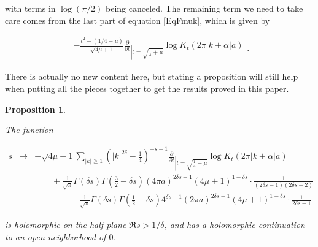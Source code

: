 \documentclass{jams-l}
\newtheorem{proposition}[theorem]{Proposition}
\theoremstyle{definition}
\theoremstyle{remark}
\numberwithin{equation}{section}
\begin{document}
            \noindent with terms in $\log \left( \pi / 2 \right)$ being canceled. The remaining term we need to take care comes from the last part of equation \eqref{EqFmuk}, which is given by
            
            \[ \begin{array}{c}
                    - \frac{t^2 - \left( 1/4 + \mu \right)}{\sqrt{4 \mu + 1}} \frac{\partial}{\partial t}_{\left \vert t = \sqrt{\frac{1}{4} + \mu} \right.} \log K_t \left( 2 \pi \left \vert k + \alpha \right \vert a \right)
                \end{array} . \]
            
            \noindent There is actually no new content here, but stating a proposition will still help when putting all the pieces together to get the results proved in this paper.
            
            \begin{proposition}
            \label{PropA11}
            
                The function
                
                \[ \begin{array}{lll}
                        \scriptstyle s & \scriptstyle \mapsto & \scriptstyle - \sqrt{4 \mu + 1} \sum\limits_{\left \vert k \right \vert \geqslant 1} \left( \left \vert k \right \vert^{2 \delta} - \frac{1}{4} \right)^{- s + 1} \frac{\partial}{\partial t}_{\left \vert t = \sqrt{\frac{1}{4} + \mu} \right.} \log K_t \left( 2 \pi \left \vert k + \alpha \right \vert a \right) \\[1em]
                        
                        && \qquad \scriptstyle + \frac{1}{\sqrt{\pi}} \Gamma \left( \delta s \right) \Gamma \left( \frac{3}{2} - \delta s \right) \left( 4 \pi a \right)^{2 \delta s - 1} \left( 4 \mu + 1 \right)^{1 - \delta s} \cdot \frac{1}{\left( 2 \delta s - 1 \right) \left( 2 \delta s - 2 \right)} \\[1em]
                        
                        && \qquad \qquad \scriptstyle + \frac{1}{\sqrt{\pi}} \Gamma \left( \delta s \right) \Gamma \left( \frac{1}{2} - \delta s \right) 4^{\delta s - 1} \left( 2 \pi a \right)^{2 \delta s - 1} \left( 4 \mu + 1 \right)^{1 - \delta s} \cdot \frac{1}{2 \delta s - 1}
                    \end{array} \]
                
                \noindent is holomorphic on the half-plane $\Re s > 1/\delta$, and has a holomorphic continuation to an open neighborhood of $0$.
            
            \end{proposition}
            
\end{document}
